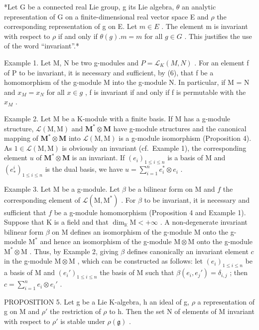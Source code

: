 *Let G be a connected real Lie group, g its Lie algebra, \(\theta\) an analytic representation of G on a finite-dimensional real vector space E and \(\rho\) the corresponding representation of g on E. Let \(m \in E\) . The element m is invariant with respect to \(\rho\) if and only if \(\theta(g).m = m\) for all \(g \in G\) . This justifies the use of the word ``invariant''.*

Example 1. Let M, N be two g-modules and \(P = \mathcal{L}_{K}(M, N)\) . For an element f of P to be invariant, it is necessary and sufficient, by (6), that f be a homomorphism of the g-module M into the g-module N. In particular, if M = N and \(x_{M} = x_{N}\) for all \(x \in g\) , f is invariant if and only if f is permutable with the \(x_{M}\) .

Example 2. Let M be a K-module with a finite basis. If M has a g-module structure, \(\mathcal{L}(\mathrm{M},\mathrm{M})\) and \(\mathbf{M}^*\otimes \mathbf{M}\) have g-module structures and the canonical mapping of \(\mathbf{M}^{*}\otimes \mathbf{M}\) into \(\mathcal{L}(\mathrm{M},\mathrm{M})\) is a g-module isomorphism (Proposition 4). As \(1\in \mathcal{L}(\mathrm{M},\mathrm{M})\) is obviously an invariant (cf.~Example 1), the corresponding element \(u\) of \(\mathbf{M}^{*}\otimes \mathbf{M}\) is an invariant. If \((e_i)_{1\leq i\leq n}\) is a basis of M and \((e_{*}^{i})_{1\leqslant i\leqslant n}\) is the dual basis, we have \(u = \sum_{i = 1}^{n}e_{i}^{*}\otimes e_{i}\) .

Example 3. Let M be a g-module. Let \(\beta\) be a bilinear form on M and \(f\) the corresponding element of \(\mathcal{L}(\mathrm{M},\mathrm{M}^*)\) . For \(\beta\) to be invariant, it is necessary and sufficient that \(f\) be a g-module homomorphism (Proposition 4 and Example 1). Suppose that K is a field and that \(\dim_{\mathbb{K}}\mathrm{M} < +\infty\) . A non-degenerate invariant bilinear form \(\beta\) on M defines an isomorphism of the g-module M onto the g-module \(\mathrm{M}^*\) and hence an isomorphism of the g-module \(\mathrm{M}\otimes \mathrm{M}\) onto the g-module \(\mathrm{M}^*\otimes \mathrm{M}\) . Thus, by Example 2, giving \(\beta\) defines canonically an invariant element \(c\) in the g-module \(\mathrm{M}\otimes \mathrm{M}\) , which can be constructed as follows: let \((e_i)_{1\leqslant i\leqslant n}\) be a basis of M and \((e_i')_{1\leqslant i\leqslant n}\) the basis of M such that \(\beta (e_i,e_j') = \delta_{i,j}\) ; then \(c = \sum_{i=1}^{n}e_i\otimes e_i'\) .

PROPOSITION 5. Let g be a Lie K-algebra, h an ideal of g, \(\rho\) a representation of g on M and \(\rho'\) the restriction of \(\rho\) to h. Then the set N of elements of M invariant with respect to \(\rho'\) is stable under \(\rho(\mathfrak{g})\) .

